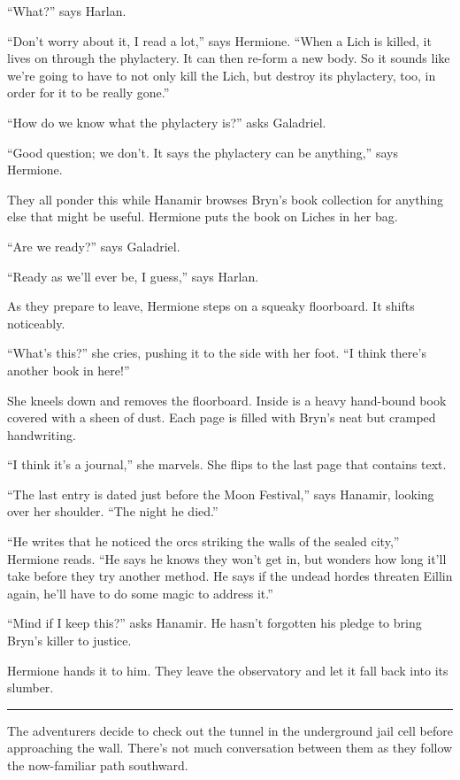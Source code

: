 \documentclass[smalldemyvopaper,11pt,twoside,onecolumn,openright,extrafontsizes]{memoir}
\begin{document}
``What?'' says Harlan.

``Don't worry about it, I read a lot,'' says Hermione. ``When a Lich is
killed, it lives on through the phylactery. It can then re-form a new
body. So it sounds like we're going to have to not only kill the Lich,
but destroy its phylactery, too, in order for it to be really gone.''

``How do we know what the phylactery is?'' asks Galadriel.

``Good question; we don't. It says the phylactery can be anything,''
says Hermione.

They all ponder this while Hanamir browses Bryn's book collection for
anything else that might be useful. Hermione puts the book on Liches in
her bag.

``Are we ready?'' says Galadriel.

``Ready as we'll ever be, I guess,'' says Harlan.

As they prepare to leave, Hermione steps on a squeaky floorboard. It
shifts noticeably.

``What's this?'' she cries, pushing it to the side with her foot. ``I
think there's another book in here!''

She kneels down and removes the floorboard. Inside is a heavy hand-bound
book covered with a sheen of dust. Each page is filled with Bryn's neat
but cramped handwriting.

``I think it's a journal,'' she marvels. She flips to the last page that
contains text.

``The last entry is dated just before the Moon Festival,'' says Hanamir,
looking over her shoulder. ``The night he died.''

``He writes that he noticed the orcs striking the walls of the sealed
city,'' Hermione reads. ``He says he knows they won't get in, but
wonders how long it'll take before they try another method. He says if
the undead hordes threaten Eillin again, he'll have to do some magic to
address it.''

``Mind if I keep this?'' asks Hanamir. He hasn't forgotten his pledge to
bring Bryn's killer to justice.

Hermione hands it to him. They leave the observatory and let it fall
back into its slumber.

\begin{center}\rule{0.5\linewidth}{\linethickness}\end{center}

The adventurers decide to check out the tunnel in the underground jail
cell before approaching the wall. There's not much conversation between
them as they follow the now-familiar path southward.
\end{document}
